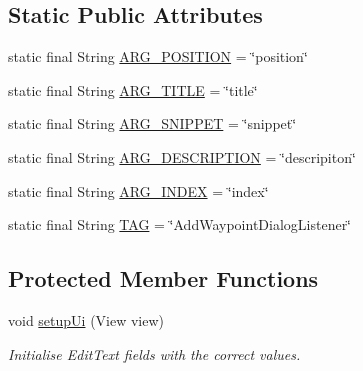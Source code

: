 \subsection*{Static Public Attributes}
\begin{DoxyCompactItemize}
\item 
static final String \hyperlink{classuk_1_1ac_1_1swan_1_1digitaltrails_1_1fragments_1_1_add_waypoint_dialog_fragment_ae5246fa7b2baf4efbd95c21e946300e1}{A\+R\+G\+\_\+\+P\+O\+S\+I\+T\+I\+O\+N} = \char`\"{}position\char`\"{}
\item 
static final String \hyperlink{classuk_1_1ac_1_1swan_1_1digitaltrails_1_1fragments_1_1_add_waypoint_dialog_fragment_ad4268e539f0c91fae91811245e56d4c5}{A\+R\+G\+\_\+\+T\+I\+T\+L\+E} = \char`\"{}title\char`\"{}
\item 
static final String \hyperlink{classuk_1_1ac_1_1swan_1_1digitaltrails_1_1fragments_1_1_add_waypoint_dialog_fragment_aa95ad5c154eed66fb388f0cb7edcd7a5}{A\+R\+G\+\_\+\+S\+N\+I\+P\+P\+E\+T} = \char`\"{}snippet\char`\"{}
\item 
static final String \hyperlink{classuk_1_1ac_1_1swan_1_1digitaltrails_1_1fragments_1_1_add_waypoint_dialog_fragment_a9e0a0e2f39659e27adcc2d7877d0bf7a}{A\+R\+G\+\_\+\+D\+E\+S\+C\+R\+I\+P\+T\+I\+O\+N} = \char`\"{}descripiton\char`\"{}
\item 
static final String \hyperlink{classuk_1_1ac_1_1swan_1_1digitaltrails_1_1fragments_1_1_add_waypoint_dialog_fragment_a9a027b90f90acbc36a2845ef91e96da9}{A\+R\+G\+\_\+\+I\+N\+D\+E\+X} = \char`\"{}index\char`\"{}
\item 
static final String \hyperlink{classuk_1_1ac_1_1swan_1_1digitaltrails_1_1fragments_1_1_add_waypoint_dialog_fragment_aa145770d7c02b78f466481179a257242}{T\+A\+G} = \char`\"{}Add\+Waypoint\+Dialog\+Listener\char`\"{}
\end{DoxyCompactItemize}
\subsection*{Protected Member Functions}
\begin{DoxyCompactItemize}
\item 
void \hyperlink{classuk_1_1ac_1_1swan_1_1digitaltrails_1_1fragments_1_1_add_waypoint_dialog_fragment_a179e450eec1d32cbe747364b7148af8e}{setup\+Ui} (View view)
\begin{DoxyCompactList}\small\item\em Initialise Edit\+Text fields with the correct values. \end{DoxyCompactList}\end{DoxyCompactItemize}
